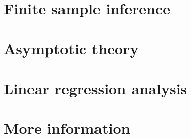 \documentclass[11pt,notitlepage]{report}
\begin{document}
\part{Finite sample inference}









\begin{appendices}

\end{appendices}

\part{Asymptotic theory}






\begin{appendices}

\end{appendices}

\part{Linear regression analysis}






\begin{appendices}

\end{appendices}

\part{More information}
\begin{appendices}


\end{appendices}


\end{document}
